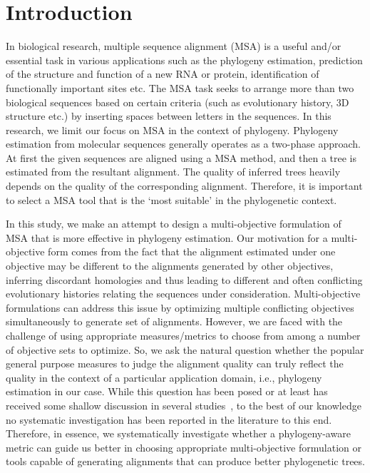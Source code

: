 \section{Introduction}
\label{sec:introducntion}
In biological research, multiple sequence alignment (MSA) is a useful and/or essential task in various applications such as the phylogeny estimation, prediction of the structure and function of a new RNA or protein, identification of functionally important sites etc. The MSA task seeks to arrange more than two biological sequences based on certain criteria (such as evolutionary history, 3D structure etc.) by inserting spaces between letters in the sequences.  In this research, we limit our focus on MSA in the context of phylogeny. Phylogeny estimation from molecular sequences generally operates as a two-phase approach. At first the given sequences are aligned using a MSA method, and then a tree is estimated from the resultant alignment. The quality of inferred trees heavily depends on the quality of the corresponding alignment. Therefore, it is important to select a MSA tool that is the `most suitable' in the phylogenetic context.

In this study, we make an attempt to design a multi-objective formulation of MSA that is more effective in phylogeny estimation. Our motivation for a multi-objective form comes from the fact that the alignment estimated under one objective may be different to the alignments generated by other objectives, inferring discordant homologies and thus leading to different and often conflicting evolutionary histories relating the sequences under consideration. Multi-objective formulations can address this issue by optimizing multiple conflicting objectives simultaneously to generate set of alignments. However, we are faced with the challenge of using appropriate measures/metrics to choose from among a number of objective sets to optimize. So, we ask the natural question whether the popular general purpose measures to judge the alignment quality can truly reflect the quality in the context of a particular application domain, i.e., phylogeny estimation in our case. While this question has been posed or at least has received some shallow discussion in several studies~\citep{warnow2013large, mirarab2015pasta, liu2009rapid}, to the best of our knowledge no systematic investigation has been reported in the literature to this end. Therefore, in essence, we systematically investigate whether a phylogeny-aware metric can guide us better in choosing appropriate multi-objective formulation or tools capable of generating alignments that can produce better phylogenetic trees.

